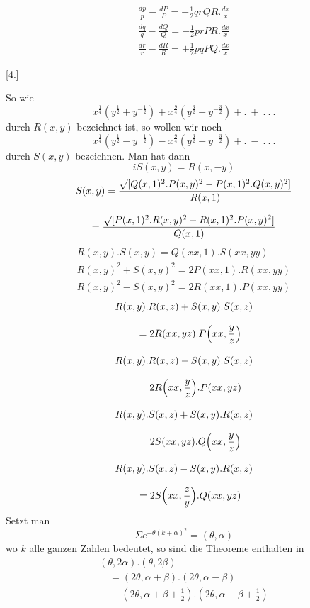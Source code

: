 

\[
\begin{gathered}
\frac{dp}{p}-\frac{dP}{P}=+\tfrac12qrQR.\frac{dx}{x}\\[8pt]
\frac{dq}{q}-\frac{dQ}{Q}=-\tfrac12prPR.\frac{dx}{x}\\[8pt]
\frac{dr}{r}-\frac{dR}{R}=+\tfrac12pqPQ.\frac{dx}{x}
\end{gathered}
\]

\par\medskip{}\centerline{[4.]}\nobreak\smallskip
So wie
\[
x^{\frac14}(y^{\frac12}+y^{-\frac12})+x^{\frac94}(y^{\frac32}+y^{-\frac32})+.\ +\ .\ .\ .
\]
durch $R(x,y)$ bezeichnet ist, so wollen wir noch
\[
x^{\frac14}(y^{\frac12}-y^{-\frac12})-x^{\frac94}(y^{\frac32}-y^{-\frac32})+.\ -\ .\ .\ .
\]
durch $S(x,y)$ bezeichnen. Man hat dann
\[
iS(x,y)=R(x,-y)
\]
\[
\begin{gathered}
S(x,y)=\frac{\surd[Q(x,1)^2.P(x,y)^2-P(x,1)^2.Q(x,y)^2]}{R(x,1)}\\[8pt]
=\frac{\surd[P(x,1)^2.R(x,y)^2-R(x,1)^2.P(x,y)^2]}{Q(x,1)}
\end{gathered}
\]
\[
\begin{gathered}
R(x,y).S(x,y)=Q(xx,1).S(xx,yy)\\[8pt]
R(x,y)^2+S(x,y)^2=2P(xx,1).R(xx,yy)\\[8pt]
R(x,y)^2-S(x,y)^2=2R(xx,1).P(xx,yy)
\end{gathered}
\]
\[
\begin{gathered}
R(x,y).R(x,z)+S(x,y).S(x,z)\\[8pt]\quad{}=2R(xx,yz).P\Bigl(xx,\frac yz\Bigr)\\[8pt]
R(x,y).R(x,z)-S(x,y).S(x,z)\\[8pt]\quad{}=2R\Bigl(xx,\frac yz\Bigr).P(xx,yz)\\[8pt]
R(x,y).S(x,z)+S(x,y).R(x,z)\\[8pt]\quad{}=2S(xx,yz).Q\Bigl(xx,\frac yz\Bigr)\\[8pt]
R(x,y).S(x,z)-S(x,y).R(x,z)\\[8pt]\quad{}=2S\Bigl(xx,\frac zy\Bigr).Q(xx,yz)
\end{gathered}
\]
Setzt man
\[
\Sigma e^{-\theta(k+\alpha)^2}=(\theta,\alpha)
\]
wo $k$ alle ganzen Zahlen bedeutet, so sind die Theoreme enthalten in
\[
\begin{gathered}(\theta,2\alpha).(\theta,2\beta)
\\[8pt]\quad{}=(2\theta,\alpha+\beta).(2\theta,\alpha-\beta)
\\[8pt]\quad{}+(2\theta,\alpha+\beta+\tfrac12).(2\theta,\alpha-\beta+\tfrac12)\end{gathered}
\]



